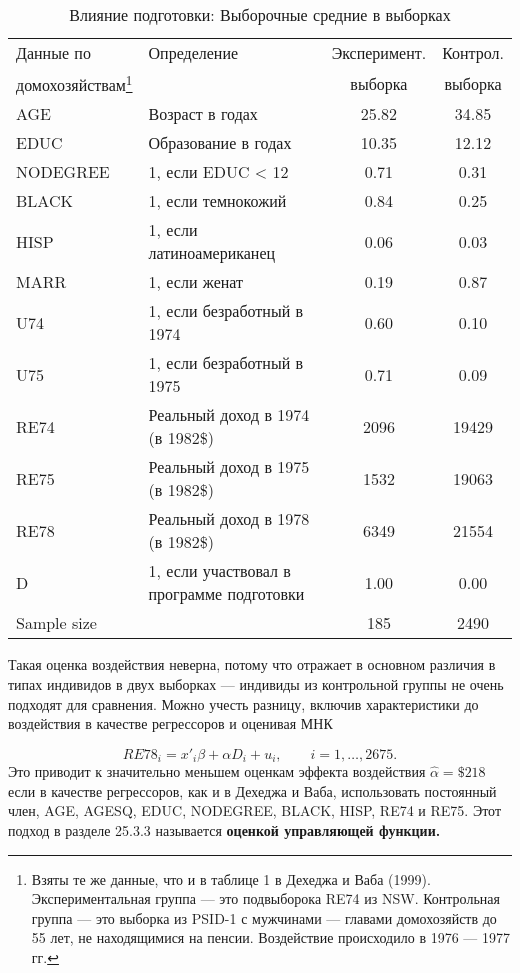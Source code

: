 \begin{table}
\caption{\label{tab: } Влияние подготовки: Выборочные средние в выборках}
\begin{minipage}{17.5cm}
\begin{center}
\begin{tabular}{llcc}
\hline
\hline
Данные по & Определение & Эксперимент. &  Контрол. \\
домохозяйствам\footnote{Взяты те же данные, что и в таблице 1 в Дехеджа и Ваба (1999). Экспериментальная группа --- это подвыборока RE74 из NSW. Контрольная группа --- это выборка из PSID-1 с мужчинами --- главами домохозяйств до 55 лет, не находящимися на пенсии. Воздействие происходило в 1976 --- 1977 гг.} & & выборка & выборка\\
\hline
AGE & Возраст в годах & 25.82 & 34.85 \\
EDUC & Образование в годах & 10.35 & 12.12 \\
NODEGREE & 1, если EDUC < 12 & 0.71 & 0.31 \\
BLACK & 1, если темнокожий & 0.84 & 0.25 \\
HISP & 1, если латиноамериканец & 0.06 & 0.03 \\
MARR & 1, если женат & 0.19 & 0.87 \\
U74 & 1, если безработный в 1974 & 0.60 & 0.10 \\
U75 & 1, если безработный в 1975 & 0.71 & 0.09 \\
RE74 & Реальный доход в 1974 (в 1982\$) & 2096 & 19429 \\
RE75 & Реальный доход в 1975 (в 1982\$) & 1532 & 19063 \\
RE78 & Реальный доход в 1978 (в 1982\$) & 6349 & 21554 \\
D & 1, если участвовал в программе подготовки & 1.00 & 0.00 \\
Sample size &  & 185 & 2490 \\
\hline
\hline
\end{tabular}
\end{center}
\end{minipage}
\end{table}

Такая оценка воздействия неверна, потому что отражает в основном различия в типах индивидов в двух выборках --- индивиды из контрольной группы не очень подходят для сравнения. Можно учесть разницу, включив характеристики до воздействия в качестве регрессоров и оценивая МНК

\begin{equation}
\label{eq25.76}
RE78_i = x'_i \beta + \alpha D_i+ u_i, \qquad i = 1, \dots, 2675. 
\end{equation}
Это приводит к значительно меньшем оценкам эффекта воздействия $\widehat{\alpha} = \$ 218$ если в качестве регрессоров, как и в Дехеджа и Ваба, использовать постоянный член, AGE, AGESQ, EDUC, NODEGREE, BLACK, HISP, RE74 и RE75. Этот подход в разделе 25.3.3 называется \bfseries оценкой управляющей функции. \mdseries 

